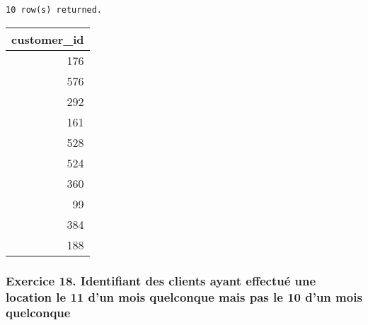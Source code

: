 \documentclass[11pt]{article}
\begin{document}
    \begin{Verbatim}[commandchars=\\\{\},fontsize=\footnotesize]
10 row(s) returned.
    \end{Verbatim}

    \begin{tabular}{r}
\toprule
   customer\_id \\
\midrule
           176 \\
           576 \\
           292 \\
           161 \\
           528 \\
           524 \\
           360 \\
            99 \\
           384 \\
           188 \\
\bottomrule
\end{tabular}

    
    \hypertarget{exercice-18.-identifiant-des-clients-ayant-effectuuxe9-une-location-le-11-dun-mois-quelconque-mais-pas-le-10-dun-mois-quelconque}{%
\subsubsection{Exercice 18. Identifiant des clients ayant effectué une
location le 11 d'un mois quelconque mais pas le 10 d'un mois
quelconque}\label{exercice-18.-identifiant-des-clients-ayant-effectuuxe9-une-location-le-11-dun-mois-quelconque-mais-pas-le-10-dun-mois-quelconque}}
\end{document}
